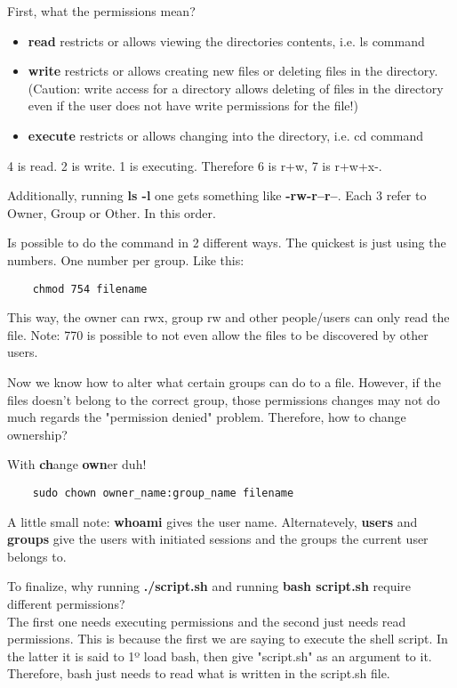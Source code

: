 \par First, what the permissions mean?
\begin{itemize}
    \item \textbf{read} restricts or allows viewing the directories contents, i.e. ls command

    \item \textbf{write} restricts or allows creating new files or deleting files in the directory. (Caution: write access for a directory allows deleting of files in the directory even if the user does not have write permissions for the file!)
    
    \item \textbf{execute} restricts or allows changing into the directory, i.e. cd command
\end{itemize}   
\par 4 is read. 2 is write. 1 is executing. Therefore 6 is r+w, 7 is r+w+x-.
\par Additionally, running \textbf{ls -l} one gets something like \textbf{-rw-r--r--}. Each 3 refer to Owner, Group or Other. In this order.

\par Is possible to do the command in 2 different ways. The quickest is just using the numbers. One number per group. Like this:
\begin{lstlisting}
    chmod 754 filename
\end{lstlisting}
\par This way, the owner can rwx, group rw and other people/users can only read the file. Note: 770 is possible to not even allow the files to be discovered by other users.

\par Now we know how to alter what certain groups can do to a file. However, if the files doesn't belong to the correct group, those permissions changes may not do much regards the "permission denied" problem. Therefore, how to change ownership?
\par With \textbf{ch}ange \textbf{own}er duh!
\begin{lstlisting}
    sudo chown owner_name:group_name filename
\end{lstlisting}
\par A little small note: \textbf{whoami} gives the user name. Alternatevely, \textbf{users} and \textbf{groups} give the users with initiated sessions and the groups the current user belongs to.


\par To finalize, why running \textbf{./script.sh} and running \textbf{bash script.sh} require different permissions? \\
The first one needs executing permissions and the second just needs read permissions. This is because the first we are saying to execute the shell script. In the latter it is said to 1º load bash, then give "script.sh" as an argument to it. Therefore, bash just needs to read what is written in the script.sh file.

